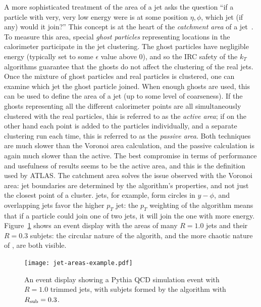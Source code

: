A more sophisticated treatment of the area of a jet asks the question ``if a particle with very, very low energy were is at some position $\eta,\phi$, which jet (if any) would it join?'' This concept is at the heart of the \textit{catchment area} of a jet~\cite{catchmentarea}. To measure this area, special \textit{ghost particles} representing locations in the calorimeter participate in the jet clustering. The ghost particles have negligible energy (typically set to some $\epsilon$ value above 0), and so the IRC safety of the $k_T$ algorithms guarantee that the ghosts do not affect the clustering of the real jets. Once the mixture of ghost particles and real particles is clustered, one can examine which jet the ghost particle joined. When enough ghosts are used, this can be used to define the area of a jet (up to some level of coarseness). If the ghosts representing all the different calorimeter points are all simultaneously clustered with the real particles, this is referred to as the \textit{active area}; if on the other hand each point is added to the particles individually, and a separate clustering run each time, this is referred to as the \textit{passive area}. Both techniques are much slower than the Voronoi area calculation, and the passive calculation is again much slower than the active. The best compromise in terms of performance and usefulness of results seems to be the active area, and this is the definition used by ATLAS. The catchment area solves the issue observed with the Voronoi area: jet boundaries are determined by the algorithm's properties, and not just the closest point of a cluster. \Antikt jets, for example, form circles in $y-\phi$, and overlapping jets favor the higher $p_T$ jet: the $p_T$ weighting of the algorithm means that if a particle could join one of two jets, it will join the one with more energy. Figure~\ref{fig:jet-reconstruction:jet-active-areas} shows an event display with the areas of many \antikt $R=1.0$ jets and their \kt $R=0.3$ subjets: the circular nature of the \antikt algorith, and the more chaotic nature of \kt, are both visible.


\begin{figure}
\centering
\texttt{[image: jet-areas-example.pdf]}
\label{fig:jet-reconstruction:jet-active-areas}
\caption{An event display showing a Pythia QCD simulation event with \antikt $R=1.0$ trimmed jets, with subjets formed by the \kt algorithm with $R_{\rm sub} = 0.3$.}
\end{figure}

